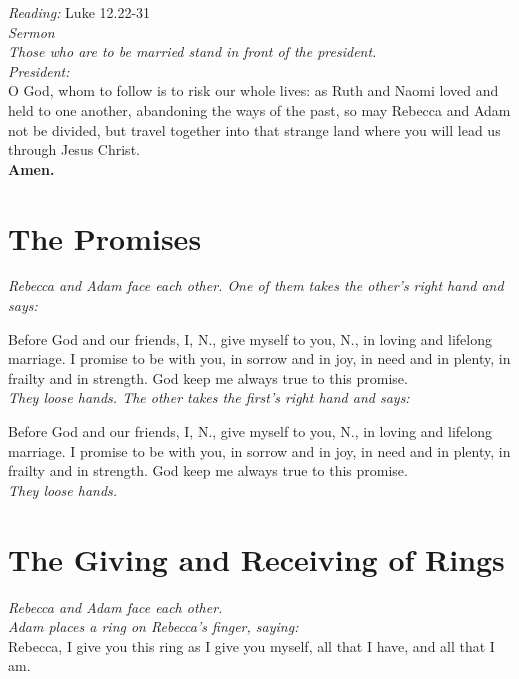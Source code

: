 \documentclass[a4paper,10pt,titlepage]{article}
\begin{document}
{\em Reading:} Luke 12.22-31\\

{\em Sermon}\\

{\em Those who are to be married stand in front of the president.}\\

{\em President:}\\ O God, whom to follow is to risk our whole lives: as Ruth and Naomi loved and held to one another, abandoning the ways of the past, so may Rebecca and Adam not be divided, but travel together into that strange land where you will lead us through Jesus Christ.\\

{\bf Amen.}


\section{The Promises}

{\em Rebecca and Adam face each other. One of them takes the other’s right hand and says:}

Before God and our friends, I, N., give myself to you, N., in loving and lifelong marriage. I promise to be with you, in sorrow and in joy, in need and in plenty, in frailty and in strength. God keep me always true to this promise.\\

{\em They loose hands. The other takes the first’s right hand and says:}

Before God and our friends, I, N., give myself to you, N., in loving and lifelong marriage. I promise to be with you, in sorrow and in joy, in need and in plenty, in frailty and in strength. God keep me always true to this promise.\\

{\em They loose hands.}

\section{The Giving and Receiving of Rings}

{\em Rebecca and Adam face each other.}\\

{\em Adam places a ring on Rebecca's finger, saying:}\\
Rebecca, I give you this ring as I give you myself, all that I have, and all that I am.\\
\end{document}
